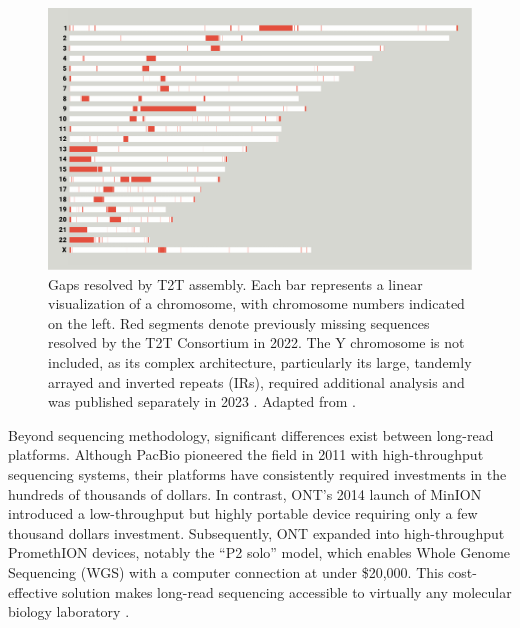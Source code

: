\begin{figure}[H]
    \centering
    \includegraphics[width=\textwidth]{img/T2T_ref.pdf}
    \caption[Gaps resolved by T2T assembly]{Gaps resolved by T2T assembly. Each 
    bar represents a linear visualization of a chromosome, with chromosome 
    numbers indicated on the left. Red segments denote previously missing 
    sequences resolved by the T2T Consortium in 2022. The Y chromosome is not 
    included, as its complex architecture, particularly its large, tandemly 
    arrayed and inverted repeats (IRs), required additional analysis and was 
    published separately in 2023 \cite{rhie_complete_2023}. Adapted from 
    \cite{zahn_filling_2022}.}
    \label{fig:T2T_ref}
\end{figure}

Beyond sequencing methodology, significant differences exist between long-read 
platforms. Although PacBio pioneered the field in 2011 with high-throughput 
sequencing systems, their platforms have consistently required investments in 
the hundreds of thousands of dollars. In contrast, ONT's 2014 launch of MinION 
introduced a low-throughput but highly portable device requiring only a few 
thousand dollars investment. Subsequently, ONT expanded into high-throughput 
PromethION devices, notably the ``P2 solo'' model, which enables Whole Genome 
Sequencing (WGS) with a computer connection at under \$20,000. This 
cost-effective solution makes long-read sequencing accessible to virtually any 
molecular biology laboratory \cite{espinosa_advancements_2024,noauthor_vega_nodate,oxford_nanopore_technologies_nanopore_nodate}.

